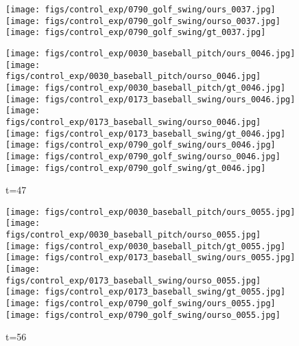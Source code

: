 \documentclass{article}
\begin{document}
\begin{appendix}
\begin{figure*}[!thbp]
\begin{subfigure}{0.12\linewidth}
  		\texttt{[image: figs/control\_exp/0790\_golf\_swing/ours\_0037.jpg]}
  		\texttt{[image: figs/control\_exp/0790\_golf\_swing/ourso\_0037.jpg]}
  		\vspace{.2cm}
  		\texttt{[image: figs/control\_exp/0790\_golf\_swing/gt\_0037.jpg]}
	\end{subfigure}
	\begin{subfigure}{0.12\linewidth}
        \caption*{t=47}
        \vspace{-7pt}
	    \texttt{[image: figs/control\_exp/0030\_baseball\_pitch/ours\_0046.jpg]}
	    \texttt{[image: figs/control\_exp/0030\_baseball\_pitch/ourso\_0046.jpg]}
	    \vspace{.2cm}
  		\texttt{[image: figs/control\_exp/0030\_baseball\_pitch/gt\_0046.jpg]}
  		\texttt{[image: figs/control\_exp/0173\_baseball\_swing/ours\_0046.jpg]}
  		\texttt{[image: figs/control\_exp/0173\_baseball\_swing/ourso\_0046.jpg]}
  		\vspace{.2cm}
  		\texttt{[image: figs/control\_exp/0173\_baseball\_swing/gt\_0046.jpg]}
  		\texttt{[image: figs/control\_exp/0790\_golf\_swing/ours\_0046.jpg]}
  		\texttt{[image: figs/control\_exp/0790\_golf\_swing/ourso\_0046.jpg]}
  		\vspace{.2cm}
  		\texttt{[image: figs/control\_exp/0790\_golf\_swing/gt\_0046.jpg]}
	\end{subfigure}
	\begin{subfigure}{0.12\linewidth}
        \caption*{t=56}
        \vspace{-7pt}
	    \texttt{[image: figs/control\_exp/0030\_baseball\_pitch/ours\_0055.jpg]}
	    \texttt{[image: figs/control\_exp/0030\_baseball\_pitch/ourso\_0055.jpg]}
	    \vspace{.2cm}
  		\texttt{[image: figs/control\_exp/0030\_baseball\_pitch/gt\_0055.jpg]}
  		\texttt{[image: figs/control\_exp/0173\_baseball\_swing/ours\_0055.jpg]}
  		\texttt{[image: figs/control\_exp/0173\_baseball\_swing/ourso\_0055.jpg]}
  		\vspace{.2cm}
  		\texttt{[image: figs/control\_exp/0173\_baseball\_swing/gt\_0055.jpg]}
  		\texttt{[image: figs/control\_exp/0790\_golf\_swing/ours\_0055.jpg]}
  		\texttt{[image: figs/control\_exp/0790\_golf\_swing/ourso\_0055.jpg]}
  		\vspace{.2cm}

\end{subfigure}
\end{figure*}
\end{appendix}
\end{document}
